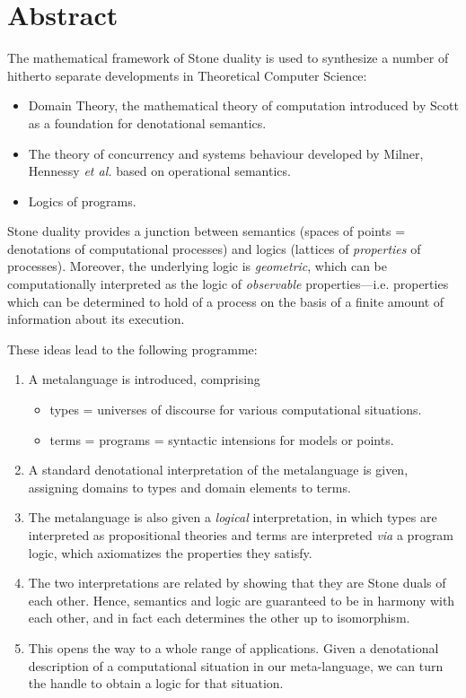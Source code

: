 \maketitle
\chapter*{Abstract}
\addtocounter{page}{1}
The mathematical framework of Stone duality is used to synthesize a number of hitherto separate developments in Theoretical Computer Science:
\begin{itemize}
\item Domain Theory, the mathematical theory of computation introduced by Scott as a foundation for denotational semantics.
\item The theory of concurrency and systems behaviour developed by Milner, Hennessy {\it et al.} based on operational semantics.
\item Logics of programs.
\end{itemize}
Stone duality provides a junction between semantics (spaces of points = denotations of computational processes) and  logics (lattices of {\em properties} of 
processes).
Moreover, the underlying logic is {\em geometric}, which can be computationally
interpreted as the logic of {\em observable} properties---i.e. properties which
can be determined to hold of a process on the basis of a finite amount
of information about its execution.

These ideas lead to the following  programme:
\begin{enumerate}
\item A metalanguage is introduced, comprising
\begin{itemize}
\item types = universes of discourse for various computational situations.
\item terms = programs = syntactic intensions for models or points.
\end{itemize}
\item A standard denotational interpretation of the metalanguage is given, assigning domains to types and domain elements to terms.
\item The metalanguage is also given a {\em logical} interpretation, in which 
types are interpreted as  propositional theories and terms are interpreted 
{\it via} a program logic, which axiomatizes the properties they satisfy.
\item The two interpretations are related by showing that they are Stone duals of each other.
Hence, semantics and logic are guaranteed to be in harmony with each other, and in fact each determines the other up to isomorphism.
\item 
This opens the way to a whole range of applications.
Given a denotational description of a computational situation in our
meta-language, we can turn the handle to obtain a logic for that situation.
\end{enumerate}
